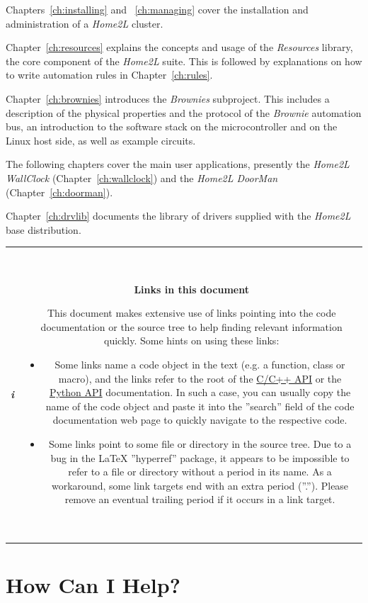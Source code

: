 \documentclass[12pt,english,parskip=half,headheight=19pt]{scrreprt}
\newcommand{\infobox}[1]{
  \par
  \medskip
  \hfill
  \setlength\arrayrulewidth{1pt}
  \begin{tabular}[t]{c|c|}
    \parbox{1.8em}{\hfill\textit{\Huge\textbf{i}\,}}
    &
    \,\parbox{0.89\linewidth}{\setlength{\parskip}{0.5em} \small #1}\,
  \end{tabular}
  \medskip
  \par
}
\newcommand{\refdoc}[2]{\href{#1}{#2}}              %
\newcommand{\theapic}{\refdoc{home2l-api_c/index.html}{C/C++ API}}
\newcommand{\theapipython}{\refdoc{home2l-api_python/index.html}{Python API}}
\begin{document}
Chapters~\ref{ch:installing} and ~\ref{ch:managing} cover the installation and administration of a \textit{Home2L} cluster.

Chapter~\ref{ch:resources} explains the concepts and usage of the \textit{Resources} library, the core component of the \textit{Home2L} suite. This is followed by explanations on how to write automation rules in Chapter~\ref{ch:rules}.

Chapter~\ref{ch:brownies} introduces the \textit{Brownies} subproject. This includes a description of the physical properties and the protocol of the \textit{Brownie} automation bus, an introduction to the software stack on the microcontroller and on the Linux host side, as well as example circuits.

The following chapters cover the main user applications, presently the \textit{Home2L WallClock} (Chapter~\ref{ch:wallclock}) and the \textit{Home2L DoorMan} (Chapter~\ref{ch:doorman}).

Chapter~\ref{ch:drvlib} documents the library of drivers supplied with the \textit{Home2L} base distribution.


\infobox{
  \textbf{Links in this document}

  This document makes extensive use of links pointing into the code documentation or the source tree to help finding
  relevant information quickly. Some hints on using these links:
  \begin{itemize}
    \item
      Some links name a code object in the text (e.g. a function, class or macro), and the links refer to the root
      of the \theapic{} or the \theapipython{} documentation. In such a case, you can usually copy the name of the code object
      and paste it into the ''search'' field of the code documentation web page to quickly navigate to the respective code.
    \item
      Some links point to some file or directory in the source tree. Due to a bug in the LaTeX ''hyperref'' package,
      it appears to be impossible to refer to a file or directory without a period in its name.
      As a workaround, some link targets end with an extra period (''.'').
      Please remove an eventual trailing period if it occurs in a link target.
  \end{itemize}
}



\clearpage
\section{How Can I Help?}
\label{sec:helping}
\end{document}
